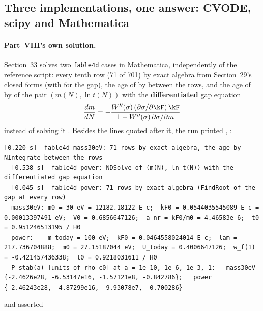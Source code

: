 \subsection{Three implementations, one answer: CVODE, scipy and Mathematica}
\label{sec:9.12}

\paragraph{Part~VIII's own solution.} Section~33 solves two \texttt{fable4d} cases in Mathematica,
independently of the reference script: every tenth row (71 of 701) by exact algebra from Section~29's closed
forms (with  for the gap), the age of  by  between the rows,
and the age of  by  of the pair $(m(N),\ln t(N))$ with the \textbf{differentiated}
gap equation
\[
  \frac{dm}{dN}=-\frac{W''(\sigma)\,(\partial\sigma/\partial\kF)\,\kF}{1-W''(\sigma)\,\partial\sigma/\partial m}
\]
instead of solving it . Besides the  lines quoted after it, the run printed
, :
\begin{Verbatim}[fontsize=\scriptsize]
  [0.220 s]  fable4d mass30eV: 71 rows by exact algebra, the age by NIntegrate between the rows
  [0.538 s]  fable4d power: NDSolve of (m(N), ln t(N)) with the differentiated gap equation
  [0.045 s]  fable4d power: 71 rows by exact algebra (FindRoot of the gap at every row)
  mass30eV: m0 = 30 eV = 12182.18122 E_c;  kF0 = 0.0544035545089 E_c = 0.00013397491 eV;  V0 = 0.6856647126;  a_nr = kF0/m0 = 4.46583e-6;  t0 = 0.951246513195 / H0
  power:    m_today = 100 eV;  kF0 = 0.0464558024014 E_c;  lam = 217.736704888;  m0 = 27.15187044 eV;  U_today = 0.4006647126;  w_f(1) = -0.421457436338;  t0 = 0.9218031611 / H0
  P_stab(a) [units of rho_c0] at a = 1e-10, 1e-6, 1e-3, 1:   mass30eV {-2.4626e28, -6.53147e16, -1.57121e8, -0.842786};   power {-2.46243e28, -4.87299e16, -9.93078e7, -0.700286}
\end{Verbatim}
and asserted 
